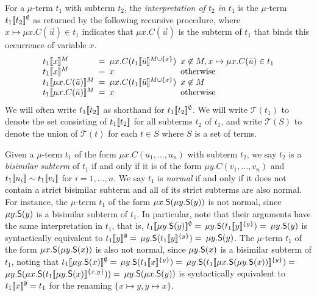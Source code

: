 For a $\mu$-term $t_1$ with subterm $t_2$, 
the \emph{interpretation of $t_2$ in $t_1$} is the $\mu$-term $t_1[\![ t_2 ]\!]^\emptyset$ as returned by the following recursive procedure,
where $x \mapsto \mu x. C( \vec u ) \in t_1$ indicates that $\mu x. C( \vec u )$ is the subterm of $t_1$ that binds this occurrence of variable $x$.
\[\begin{array}{l@{\hspace{.5em}}l@{\hspace{.5em}}l@{\hspace{.5em}}l}
t_1\interp{x}^M & = & \mu x. C( t_1\interp{ \vec u}^{M \cup \{ x \}}) & x \not\in M, x \mapsto \mu x. C( \vec u ) \in t_1  \\
t_1\interp{x}^M & = & x & \text{otherwise} \\
t_1\interp{\mu x. C( \vec u )}^M & = & \mu x. C( t_1\interp{ \vec u }^{M \cup \{ x \}} ) & x \not\in M \\
t_1\interp{\mu x. C( \vec u )}^M & = & x & \text{otherwise}
\end{array}\]
We will often write $t_1[\![ t_2 ]\!]$ as shorthand for $t_1[\![ t_2 ]\!]^\emptyset$.
We will write $\mathcal{T}( t_1 )$ to denote the set consisting of $t_1[\![ t_2 ]\!]$ for all subterms $t_2$ of $t_1$,
and write $\mathcal{T}( S )$ to denote the union of $\mathcal{T}( t )$ for each $t \in S$ where $S$ is a set of terms.

Given a $\mu$-term $t_1$ of the form $\mu x. C( u_1, \ldots, u_n )$ with subterm $t_2$,
we say $t_2$ is a \emph{bisimilar subterm} of $t_1$ if and only if it is of the form
$\mu y. C( v_1, \ldots, v_n )$ and $t_1[\![  u_i  ]\!] \sim t_1[\![  v_i  ]\!]$ for $i = 1,\ldots, n$.
We say $t_1$ is \emph{normal} if and only if it does not contain a strict bisimilar subterm
and all of its strict subterms are also normal.
For instance, the $\mu$-term $t_1$ of the form $\mu x. \textsf{S}( \mu y. \textsf{S}( y ) )$ is not normal, 
since $\mu y. \textsf{S}( y )$ is a bisimilar subterm of $t_1$.
In particular, note that their arguments have the same interpretation in $t_1$, 
that is,
$t_1[\![ \mu y. \textsf{S}( y ) ]\!]^\emptyset =$ 
$\mu y. \textsf{S}( t_1[\![ y ]\!]^{\{y\}} ) =$ 
$\mu y. \textsf{S}( y )$ 
is syntactically equivalent to
$t_1[\![ y ]\!]^\emptyset =$ 
$\mu y. \textsf{S}( t_1[\![ y ]\!]^{\{y\}} ) =$ 
$\mu y. \textsf{S}( y )$.
The $\mu$-term $t_1$ of the form $\mu x. \textsf{S}( \mu y. \textsf{S}( x ) )$ is also not normal, 
since $\mu y. \textsf{S}( x )$ is a bisimilar subterm of $t_1$,
noting that
$t_1[\![ \mu y. \textsf{S}( x ) ]\!]^\emptyset =$ 
$\mu y. \textsf{S}( t_1[\![ x ]\!]^{\{y\}} ) =$ 
$\mu y. \textsf{S}( t_1[\![ \mu x. \textsf{S}( \mu y. \textsf{S}( x ) )  ]\!]^{\{y\}} ) =$ 
$\mu y. \textsf{S}( \mu x. \textsf{S}( t_1[\![ \mu y. \textsf{S}( x ) ]\!]^{\{x,y\}} ) ) =$ 
$\mu y. \textsf{S}( \mu x. \textsf{S}( y ) )$
is syntactically equivalent to $t_1[\![ x ]\!]^\emptyset = t_1$ for the renaming $\{ x \mapsto y, y \mapsto x \}$.

